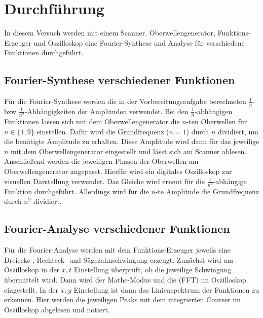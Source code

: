 \section{Durchführung}
\label{sec:Durchführung}
In diesem Versuch werden mit einem Scanner, Oberwellengenerator, Funktions-Erzeuger und Oszilloskop eine 
Fourier-Synthese und Analyse für verschiedene Funktionen durchgeführt.
\subsection{Fourier-Synthese verschiedener Funktionen}
Für die Fourier-Synthese werden die in der Vorbereitungsaufgabe berechneten 
$\frac{1}{n}$- bzw $\frac{1}{n^2}$-Abhängigkeiten der Amplituden verwendet. 
Bei den $\frac{1}{n}$-abhängigen Funktionen lassen sich mit dem Oberwellengenerator
die $n$-ten Oberwellen für $n \in \{1,9\}$ einstellen. Dafür wird die Grundfrequenz 
($n=1$) durch $n$ dividiert, um die benötigte Amplitude zu erhalten. Diese Amplitude 
wird dann für das jeweilige $n$ mit dem Oberwellengenerator eingestellt und lässt sich am
Scanner ablesen.
Anschließend werden die jeweiligen Phasen der Oberwellen am Oberwellengenerator angepasst. 
Hierfür wird ein digitales Oszilloskop zur visuellen Darstellung verwendet. 
Das Gleiche wird erneut für die $\frac{1}{n^2}$-abhängige Funktion durchgeführt. Allerdings
wird für die $n$-te Amplitude die Grundfrequenz durch $n^2$ dividiert. 
\subsection{Fourier-Analyse verschiedener Funktionen}
Für die Fourier-Analyse werden mit dem Funktions-Erzeuger jeweils eine Dreiecks-, Rechteck- und 
Sägezahnschwingung erzeugt. Zunächst wird am Oszilloskop in der $x,t$ Einstellung überprüft,
ob die jeweilige Schwingung übermittelt wird. Dann wird der Mathe-Modus und die \grqq{}(FFT)
im Oszilloskop eingestellt. In der $x,y$ Einstellung ist dann das Linienspektrum der Funktionen zu erkennen. Hier werden die jeweiligen Peaks mit
dem integrierten Courser im Oszilloskop abgelesen und notiert.